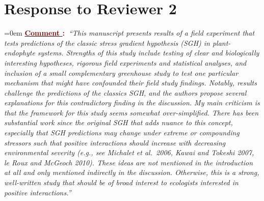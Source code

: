 \documentclass[12pt]{article}
\newcounter{cN}
\newcommand{\comment}[1]{
	\vspace{2em}
	\refstepcounter{cN} %
	\noindent \hangindent=0em \textbf{\textcolor{Maroon}{\uline{Comment \thecN}:~}}\emph{``#1''}
	}
\providecommand{\uline}[1]{\underline{#1}}
\begin{document}
\section{Response to Reviewer 2}
\vspace{-2em}

\comment{This manuscript presents results of a field experiment that tests predictions of the classic stress gradient hypothesis (SGH) in plant-endophyte systems. Strengths of this study include testing of clear and biologically interesting hypotheses, rigorous field experiments and statistical analyses, and inclusion of a small complementary greenhouse study to test one particular mechanism that might have confounded their field study findings. Notably, results challenge the predictions of the classics SGH, and the authors propose several explanations for this contradictory finding in the discussion. My main criticism is that the framework for this study seems somewhat over-simplified. There has been substantial work since the original SGH that adds nuance to this concept, especially that SGH predictions may change under extreme or compounding stressors such that positive interactions should increase with decreasing environmental severity (e.g., see Michalet et al.\ 2006, Kawai and Tokeshi 2007, le Roux and McGeoch 2010). These ideas are not mentioned in the introduction at all and only mentioned indirectly in the discussion. Otherwise, this is a strong, well-written study that should be of broad interest to ecologists interested in positive interactions.}
\end{document}
